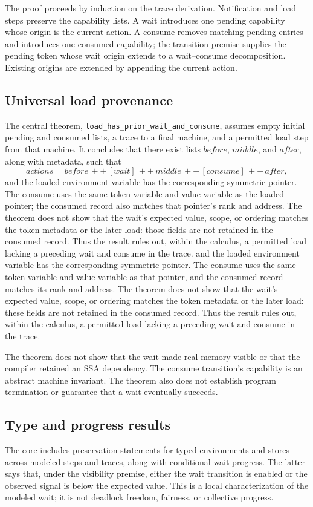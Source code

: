 \documentclass[a4paper,USenglish]{lipics-v2021}
\begin{document}
The proof proceeds by induction on the trace derivation. Notification and load steps preserve the capability lists. A wait introduces one pending capability whose origin is the current action. A consume removes matching pending entries and introduces one consumed capability; the transition premise supplies the pending token whose wait origin extends to a wait--consume decomposition. Existing origins are extended by appending the current action.

\subsection{Universal load provenance}
The central theorem, \texttt{load\_has\_prior\_wait\_and\_consume}, assumes empty initial pending and consumed lists, a trace to a final machine, and a permitted load step from that machine. It concludes that there exist lists \(before\), \(middle\), and \(after\), along with metadata, such that
\[
 actions = before \, ++ \, [wait] \, ++ \, middle \, ++ \, [consume] \, ++ \, after,
\]
and the loaded environment variable has the corresponding symmetric pointer. The consume uses the same token variable and value variable as the loaded pointer; the consumed record also matches that pointer's rank and address. The theorem does not show that the wait's expected value, scope, or ordering matches the token metadata or the later load: those fields are not retained in the consumed record. Thus the result rules out, within the calculus, a permitted load lacking a preceding wait and consume in the trace.
and the loaded environment variable has the corresponding symmetric pointer.
The consume uses the same token variable and value variable as that pointer,
and the consumed record matches its rank and address. The theorem does not
show that the wait's expected value, scope, or ordering matches the token
metadata or the later load: these fields are not retained in the consumed
record. Thus the result rules out, within the calculus, a permitted load
lacking a preceding wait and consume in the trace.

The theorem does not show that the wait made real memory visible or that the compiler retained an SSA dependency. The consume transition's capability is an abstract machine invariant. The theorem also does not establish program termination or guarantee that a wait eventually succeeds.

\subsection{Type and progress results}
The core includes preservation statements for typed environments and stores across modeled steps and traces, along with conditional wait progress. The latter says that, under the visibility premise, either the wait transition is enabled or the observed signal is below the expected value. This is a local characterization of the modeled wait; it is not deadlock freedom, fairness, or collective progress.
\end{document}
